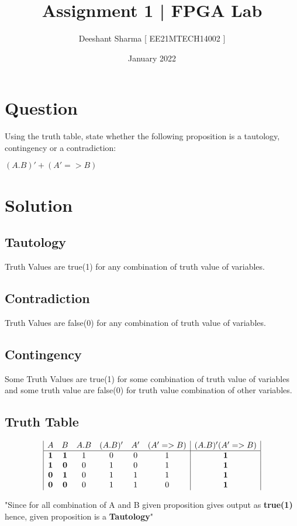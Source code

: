 \documentclass{article}
\title{\textbf{Assignment 1}  |\textbf{ FPGA Lab}}
\author{Deeshant Sharma [ EE21MTECH14002 ]}
\date{January 2022}
\begin{document}
\maketitle

\section{Question}

Using the truth table, state whether the following proposition is a tautology, contingency or a contradiction:
\begin{center}
    $ ( A . B )' + (  A' => B ) $
\end{center}

\section{Solution}

\subsection{Tautology}
Truth Values are true(1) for any combination of truth value of variables.

\subsection{Contradiction}
Truth Values are false(0) for any combination of truth value of variables.

\subsection{Contingency}
Some Truth Values are true(1) for some combination of truth value of variables and some truth value are false(0) for  truth value combination of other variables.


\subsection{Truth Table}
\begin{displaymath}
\begin{array}{|c c c c c c|c|}
A & B & A . B & (A . B)' &  A' & (A' => B ) &  (A . B)'( A' => B) \\ %
\hline %
\textbf{1} & \textbf{1} & 1 & 0 & 0 & 1 & \textbf{1}\\
\textbf{1} & \textbf{0} & 0 & 1 & 0 & 1 & \textbf{1}\\
\textbf{0} & \textbf{1} & 0 & 1 & 1 & 1 & \textbf{1}\\
\textbf{0} & \textbf{0} & 0 & 1 & 1 & 0 & \textbf{1}\\
\end{array}
\end{displaymath}

"Since for all combination of A and B given proposition gives output as \textbf{true(1)} hence, given proposition is a \textbf{Tautology}" 
\end{document}
